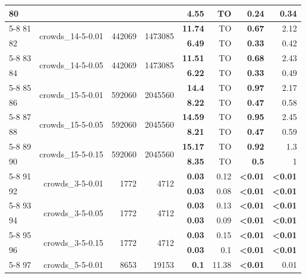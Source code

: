 \begin{longtable}{lrr@{\hskip 12pt}r@{\hskip 12pt}r@{\hskip 12pt}r@{\hskip 12pt}r@{\hskip 12pt}r}
80 &  &  &  & \textbf{4.55} & TO & \textbf{0.24} & 0.34 \\
\cmidrule{5-8}
81 & \multirow{2}{*}{crowds\_14-5-0.01} & \multirow{2}{*}{442069} & \multirow{2}{*}{1473085} & \textbf{11.74} & TO & \textbf{0.67} & 2.12 \\
82 &  &  &  & \textbf{6.49} & TO & \textbf{0.33} & 0.42 \\
\cmidrule{5-8}
83 & \multirow{2}{*}{crowds\_14-5-0.05} & \multirow{2}{*}{442069} & \multirow{2}{*}{1473085} & \textbf{11.51} & TO & \textbf{0.68} & 2.43 \\
84 &  &  &  & \textbf{6.22} & TO & \textbf{0.33} & 0.49 \\
\cmidrule{5-8}
85 & \multirow{2}{*}{crowds\_15-5-0.01} & \multirow{2}{*}{592060} & \multirow{2}{*}{2045560} & \textbf{14.4} & TO & \textbf{0.97} & 2.17 \\
86 &  &  &  & \textbf{8.22} & TO & \textbf{0.47} & 0.58 \\
\cmidrule{5-8}
87 & \multirow{2}{*}{crowds\_15-5-0.05} & \multirow{2}{*}{592060} & \multirow{2}{*}{2045560} & \textbf{14.59} & TO & \textbf{0.95} & 2.45 \\
88 &  &  &  & \textbf{8.21} & TO & \textbf{0.47} & 0.59 \\
\cmidrule{5-8}
89 & \multirow{2}{*}{crowds\_15-5-0.15} & \multirow{2}{*}{592060} & \multirow{2}{*}{2045560} & \textbf{15.17} & TO & \textbf{0.92} & 1.3 \\
90 &  &  &  & \textbf{8.35} & TO & \textbf{0.5} & 1 \\
\cmidrule{5-8}
91 & \multirow{2}{*}{crowds\_3-5-0.01} & \multirow{2}{*}{1772} & \multirow{2}{*}{4712} & \textbf{0.03} & 0.12 & \textbf{<0.01} & \textbf{<0.01} \\
92 &  &  &  & \textbf{0.03} & 0.08 & \textbf{<0.01} & \textbf{<0.01} \\
\cmidrule{5-8}
93 & \multirow{2}{*}{crowds\_3-5-0.05} & \multirow{2}{*}{1772} & \multirow{2}{*}{4712} & \textbf{0.03} & 0.13 & \textbf{<0.01} & \textbf{<0.01} \\
94 &  &  &  & \textbf{0.03} & 0.09 & \textbf{<0.01} & \textbf{<0.01} \\
\cmidrule{5-8}
95 & \multirow{2}{*}{crowds\_3-5-0.15} & \multirow{2}{*}{1772} & \multirow{2}{*}{4712} & \textbf{0.03} & 0.15 & \textbf{<0.01} & \textbf{<0.01} \\
96 &  &  &  & \textbf{0.03} & 0.1 & \textbf{<0.01} & \textbf{<0.01} \\
\cmidrule{5-8}
97 & \multirow{2}{*}{crowds\_5-5-0.01} & \multirow{2}{*}{8653} & \multirow{2}{*}{19153} & \textbf{0.1} & 11.38 & \textbf{<0.01} & 0.01 \\

\end{longtable}
